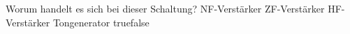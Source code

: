     {Worum handelt es sich bei dieser Schaltung?}
    {NF-Verstärker}
    {ZF-Verstärker}
    {HF-Verstärker}
    {Tongenerator}
    {true}{false}